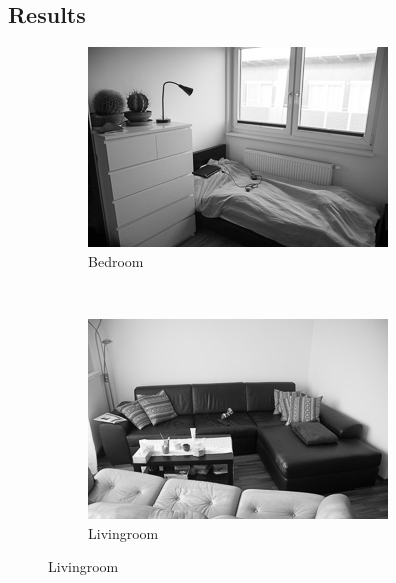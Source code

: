 \documentclass[subfigure,epsfig,fleqn,float,numbers=noenddot]{scrartcl}
\begin{document}
\subsection{Results}
\label{sec:results}

\begin{figure}
        \centering
        \begin{subfigure}[b]{0.3\textwidth}
                \includegraphics[width=\textwidth]{img/own/bedroom}
                \caption{Bedroom}
                \label{fig:bedroom}
        \end{subfigure}%
        ~ %
        \begin{subfigure}[b]{0.3\textwidth}
                \includegraphics[width=\textwidth]{img/own/livingroom}
                \caption{Livingroom}

\end{subfigure}
\end{figure}
\end{document}
